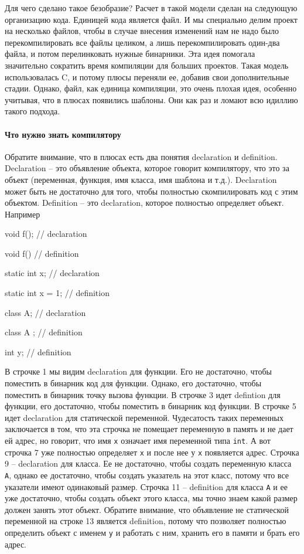 \documentclass{article}
\begin{document}
Для чего сделано такое безобразие? Расчет в такой модели сделан на следующую организацию кода. Единицей кода является файл. И мы специально делим проект на несколько файлов, чтобы в случае внесения изменений нам не надо было перекомпилировать все файлы целиком, а лишь перекомпилировать один-два файла, и потом перелинковать нужные бинарники. Эта идея помогала значительно сократить время компиляции для больших проектов. Такая модель использовалась C, и потому плюсы переняли ее, добавив свои дополнительные стадии. Однако, файл, как единица компиляции, это очень плохая идея, особенно учитывая, что в плюсах появились шаблоны. Они как раз и ломают всю идиллию такого подхода.

\paragraph{Что нужно знать компилятору}

Обратите внимание, что в плюсах есть два понятия declaration и definition. Declaration -- это объявление объекта, которое говорит компилятору, что это за объект (переменная, функция, имя класса, имя шаблона и т.д.). Declaration может быть не достаточно для того, чтобы полностью скомпилировать код с этим объектом. Definition -- это declaration, которое полностью определяет объект. Например
\begin{cppcode}
void f(); // declaration

void f() {} // definition

static int x; // declaration

static int x = 1; // definition

class A; // declaration

class A {}; // definition

int y; // definition
\end{cppcode}
В строчке 1 мы видим declaration для функции. Его не достаточно, чтобы поместить в бинарник код для функции. Однако, его достаточно, чтобы поместить в бинарник точку вызова функции. В строчке 3 идет defintion для функции, его достаточно, чтобы поместить в бинарник код функции. В строчке 5 идет declaration для статической переменной. Чудесатость таких переменных заключается в том, что эта строчка не помещает переменную в память и не дает ей адрес, но говорит, что имя \verb"x" означает имя переменной типа \verb"int". А вот строчка 7 уже полностью определяет \verb"x" и после нее у \verb"x" появляется адрес. Строчка 9 -- declaration для класса. Ее не достаточно, чтобы создать переменную класса \verb"A", однако ее достаточно, чтобы создать указатель на этот класс, потому что все указатели имеют одинаковый размер. Строчка 11 -- definition для класса \verb"A" и ее уже достаточно, чтобы создать объект этого класса, мы точно знаем какой размер должен занять этот объект. Обратите внимание, что объявление не статической переменной на строке 13 является definition, потому что позволяет полностью определить объект с именем \verb"y" и работать с ним, хранить его в памяти и брать его адрес.
\end{document}

